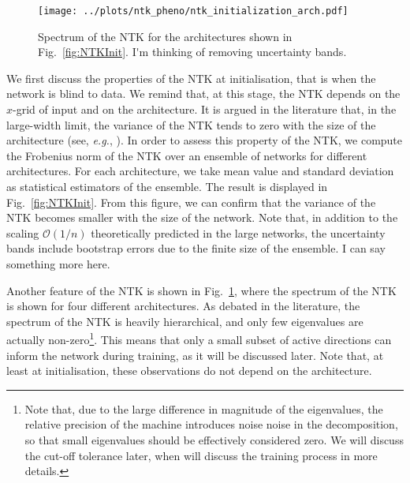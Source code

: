 \begin{figure}[h!]
  \centering

  \texttt{[image: ../plots/ntk\_pheno/ntk\_initialization\_arch.pdf]}
  \caption{Spectrum of the NTK for the architectures shown in
  Fig.~\ref{fig:NTKInit}. \ac{I'm thinking of removing uncertainty bands.}}
  \label{fig:NTKSpectrum}
\end{figure}
We first discuss the properties of the NTK at initialisation, that is when the
network is blind to data. We remind that, at this stage, the NTK depends on the
$x$-grid of input and on the architecture. It is argued in the literature that,
in the large-width limit, the variance of the NTK tends to zero with the size of
the architecture (see, \textit{e.g.}, \cite{Roberts:2021fes}). In order to
assess this property of the NTK, we compute the Frobenius norm of the NTK over
an ensemble of networks for different architectures. For each architecture, we
take mean value and standard deviation as statistical estimators of the
ensemble. The result is displayed in Fig.~\ref{fig:NTKInit}. From this figure,
we can confirm that the variance of the NTK becomes smaller with the size of the
network. Note that, in addition to the scaling $\mathcal{O}(1/n)$ theoretically
predicted in the large networks, the uncertainty bands include bootstrap errors
due to the finite size of the ensemble. \ac{I can say something more here.}

Another feature of the NTK is shown in Fig.~\ref{fig:NTKSpectrum}, where the
spectrum of the NTK is shown for four different architectures. As debated in the
literature, the spectrum of the NTK is heavily hierarchical, and only few
eigenvalues are actually non-zero\footnote{Note that, due to the large
difference in magnitude of the eigenvalues, the relative precision of the
machine introduces noise noise in the decomposition, so that small eigenvalues
should be effectively considered zero. We will discuss the cut-off tolerance
later, when will discuss the training process in more details.}. This means that
only a small subset of active directions can inform the network during training,
as it will be discussed later. Note that, at least at initialisation, these
observations do not depend on the architecture.

